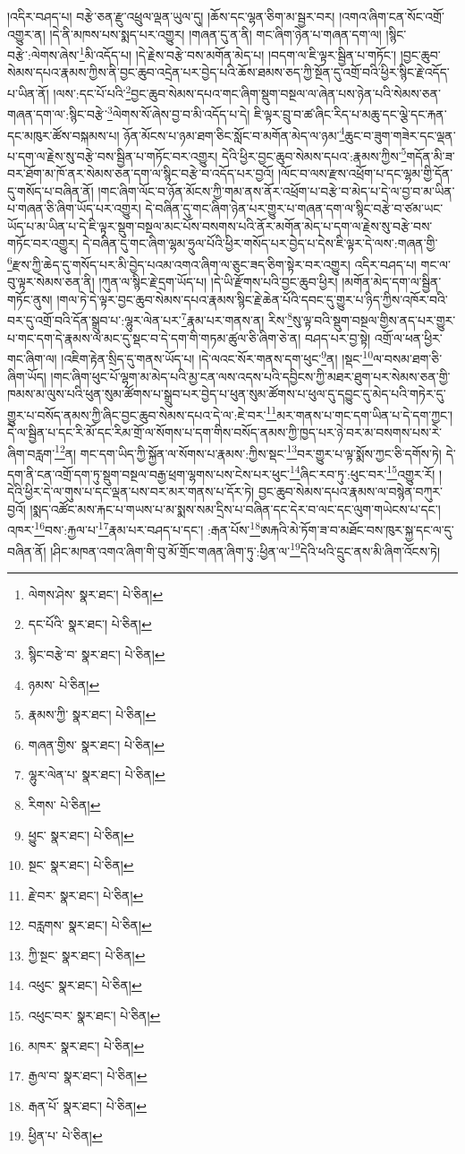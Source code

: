 །འདིར་བཤད་པ། བརྩེ་ཅན་རྫུ་འཕྲུལ་ལྡན་ཡུལ་དུ། །ཆོས་དང་ལྷན་ཅིག་མ་སྦྱར་བར། །འགའ་ཞིག་ངན་སོང་འགྲོ་འགྱུར་ན། །དེ་ནི་མཁས་པས་སྨད་པར་འགྱུར། །གཞན་དུ་ན་ནི། གང་ཞིག་ཉེན་པ་གཞན་དག་ལ། །སྙིང་བརྩེ་:ལེགས་ཞེས་\footnote{ལེགས་ཤེས་  སྣར་ཐང་།  པེ་ཅིན། }མི་འདོད་པ། །དེ་རྗེས་བརྩེ་བས་མགོན་མེད་པ། །བདག་ལ་ཇི་ལྟར་སྦྱིན་པ་གཏོང་། །བྱང་ཆུབ་སེམས་དཔའ་རྣམས་ཀྱིས་ནི་བྱང་ཆུབ་འདྲེན་པར་བྱེད་པའི་ཆོས་ཐམས་ཅད་ཀྱི་སྔོན་དུ་འགྲོ་བའི་ཕྱིར་སྙིང་རྗེ་འདོད་པ་ཡིན་ནོ། །ལས་:དང་པོ་པའི་\footnote{དང་པོའི་  སྣར་ཐང་།  པེ་ཅིན། }བྱང་ཆུབ་སེམས་དཔའ་གང་ཞིག་སྡུག་བསྔལ་ལ་ཞེན་པས་ཉེན་པའི་སེམས་ཅན་གཞན་དག་ལ་:སྙིང་བརྩེ་\footnote{སྙིང་བརྩེ་བ་  སྣར་ཐང་།  པེ་ཅིན། }ལེགས་སོ་ཞེས་བྱ་བ་མི་འདོད་པ་དེ། ཇི་ལྟར་བྲུ་བ་ཚ་ཞིང་རིད་པ་མཆུ་དང་ལྕེ་དང་རྐན་དང་མཁུར་ཚོས་བསྐམས་པ། ཉོན་མོངས་པ་ཉམ་ཐག་ཅིང་སློང་བ་མགོན་མེད་ལ་ཉམ་\footnote{ཉམས་  པེ་ཅིན། }ཆུང་བ་ཟུག་གཟེར་དང་ལྡན་པ་དག་ལ་རྗེས་སུ་བརྩེ་བས་སྦྱིན་པ་གཏོང་བར་འགྱུར། དེའི་ཕྱིར་བྱང་ཆུབ་སེམས་དཔའ་:རྣམས་ཀྱིས་\footnote{རྣམས་ཀྱི་  སྣར་ཐང་།  པེ་ཅིན། }གདོན་མི་ཟ་བར་ཐོག་མ་ཁོ་ནར་སེམས་ཅན་དག་ལ་སྙིང་བརྩེ་བ་འདོད་པར་བྱའོ། །ལོང་བ་ལས་རྫས་འཕྲོག་པ་དང་ལྷམ་གྱི་དོན་དུ་གསོད་པ་བཞིན་ནོ། །གང་ཞིག་ལོང་བ་ཉོན་མོངས་ཀྱི་གམ་ནས་ནོར་འཕྲོག་པ་བརྩེ་བ་མེད་པ་དེ་ལ་བྱ་བ་མ་ཡིན་པ་གཞན་ཅི་ཞིག་ཡོད་པར་འགྱུར། དེ་བཞིན་དུ་གང་ཞིག་ཉེན་པར་གྱུར་པ་གཞན་དག་ལ་སྙིང་བརྩེ་བ་ཙམ་ཡང་ཡོད་པ་མ་ཡིན་པ་དེ་ཇི་ལྟར་སྡུག་བསྔལ་མང་པོས་བསགས་པའི་ནོར་མགོན་མེད་པ་དག་ལ་རྗེས་སུ་བརྩེ་བས་གཏོང་བར་འགྱུར། དེ་བཞིན་དུ་གང་ཞིག་ལྷམ་ཧྲུལ་པོའི་ཕྱིར་གསོད་པར་བྱེད་པ་དེས་ཇི་ལྟར་དེ་ལས་:གཞན་གྱི་\footnote{གཞན་གྱིས་  སྣར་ཐང་།  པེ་ཅིན། }རྫས་ཀྱི་ཆེད་དུ་གསོད་པར་མི་བྱེད་པའམ་འགའ་ཞིག་ལ་ཅུང་ཟད་ཅིག་སྟེར་བར་འགྱུར། འདིར་བཤད་པ། གང་ལ་བུ་ལྟར་སེམས་ཅན་ནི། །ཀུན་ལ་སྙིང་རྗེ་དྲག་ཡོད་པ། །དེ་ཡི་རྫོགས་པའི་བྱང་ཆུབ་ཕྱིར། །མགོན་མེད་དག་ལ་སྦྱིན་གཏོང་ནུས། །གལ་ཏེ་དེ་ལྟར་བྱང་ཆུབ་སེམས་དཔའ་རྣམས་སྙིང་རྗེ་ཆེན་པོའི་དབང་དུ་གྱུར་པ་ཉིད་ཀྱིས་འཁོར་བའི་བར་དུ་འགྲོ་བའི་དོན་སྒྲུབ་པ་:ལྷུར་ལེན་པར་\footnote{ལྷུར་ལེན་པ་  སྣར་ཐང་།  པེ་ཅིན། }རྣམ་པར་གནས་ན། རིས་\footnote{རིགས་  པེ་ཅིན། }སུ་ལྟ་བའི་སྡུག་བསྔལ་གྱིས་ནད་པར་གྱུར་པ་གང་དག་དེ་རྣམས་ལ་མང་དུ་སྡང་བ་དེ་དག་གི་གཏམ་ཚུལ་ཅི་ཞིག་ཅེ་ན། བཤད་པར་བྱ་སྟེ། འགྲོ་ལ་ཕན་ཕྱིར་གང་ཞིག་ལ། །འཇིག་རྟེན་སྲིད་དུ་གནས་ཡོད་པ། །དེ་ལའང་སོར་གནས་དག་ཕུང་\footnote{ཕྱུང་  སྣར་ཐང་།  པེ་ཅིན། }ན། །སྡང་\footnote{སྔང་  སྣར་ཐང་།  པེ་ཅིན། }ལ་བསམ་ཐག་ཅི་ཞིག་ཡོད། །གང་ཞིག་ཕུང་པོ་ལྷག་མ་མེད་པའི་མྱ་ངན་ལས་འདས་པའི་དབྱིངས་ཀྱི་མཐར་ཐུག་པར་སེམས་ཅན་གྱི་ཁམས་མ་ལུས་པའི་ཕུན་སུམ་ཚོགས་པ་སྒྲུབ་པར་བྱེད་པ་ཕུན་སུམ་ཚོགས་པ་ཕུལ་དུ་དབྱུང་དུ་མེད་པའི་གཏེར་དུ་གྱུར་པ་བསོད་ནམས་ཀྱི་ཞིང་བྱང་ཆུབ་སེམས་དཔའ་དེ་ལ་:ཇེ་བར་\footnote{རྗེ་བར་  སྣར་ཐང་།  པེ་ཅིན། }མར་གནས་པ་གང་དག་ཡིན་པ་དེ་དག་ཀྱང་། དེ་ལ་སྦྱིན་པ་དང་རི་མོ་དང་རིམ་གྲོ་ལ་སོགས་པ་དག་གིས་བསོད་ནམས་ཀྱི་ཁྱད་པར་ཉེ་བར་མ་བསགས་པས་རེ་ཞིག་བརླག་\footnote{བརླགས་  སྣར་ཐང་།  པེ་ཅིན། }ན། གང་དག་ཡིད་ཀྱི་སྐྱོན་ལ་སོགས་པ་རྣམས་:ཀྱིས་སྡང་\footnote{ཀྱི་སྔང་  སྣར་ཐང་།  པེ་ཅིན། }བར་གྱུར་པ་ལྟ་སྨོས་ཀྱང་ཅི་དགོས་ཏེ། དེ་དག་ནི་ངན་འགྲོ་དག་ཏུ་སྡུག་བསྔལ་བརྒྱ་ཕྲག་ལྷགས་པས་ངེས་པར་ཕུང་\footnote{འཕུང་  སྣར་ཐང་།  པེ་ཅིན། }ཞིང་རབ་ཏུ་:ཕུང་བར་\footnote{འཕུང་བར་  སྣར་ཐང་།  པེ་ཅིན། }འགྱུར་རོ། །དེའི་ཕྱིར་དེ་ལ་གུས་པ་དང་ལྡན་པས་བར་མར་གནས་པ་དོར་ཏེ། བྱང་ཆུབ་སེམས་དཔའ་རྣམས་ལ་བསྙེན་བཀུར་བྱའོ། །སྨད་འཚོང་མས་རྐང་པ་གཡས་པ་མ་སྨས་སམ་དྲིས་པ་བཞིན་དང་དེར་བ་ལང་དང་ལུག་གཡེངས་པ་དང་། འཁར་\footnote{མཁར་  སྣར་ཐང་།  པེ་ཅིན། }བས་:རྐྱལ་པ་\footnote{རྒྱལ་བ་  སྣར་ཐང་།  པེ་ཅིན། }རྣམ་པར་བཤད་པ་དང་། :རྒན་པོས་\footnote{རྒན་པོ་  སྣར་ཐང་།  པེ་ཅིན། }ཨརྐའི་མེ་ཏོག་ཟ་བ་མཐོང་བས་ཁུར་སྐྱ་དང་ལ་དུ་བཞིན་ནོ། །ཤིང་མཁན་འགའ་ཞིག་གི་བུ་མོ་གྲོང་གཞན་ཞིག་ཏུ་:ཕྱིན་ལ་\footnote{ཕྱིན་པ་  པེ་ཅིན། }དེའི་ཕའི་དྲུང་ནས་མི་ཞིག་འོངས་ཏེ། 